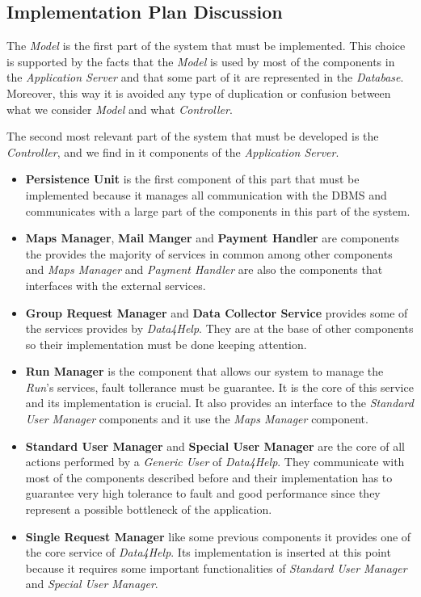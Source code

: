 \subsection{Implementation Plan Discussion}
\myparagraph{}
The \textit{Model} is the first part of the system that must be implemented. This choice is supported by the facts that the \textit{Model} is used by most of the components in the \textit{Application Server} and that some part of it are represented in the \textit{Database}. Moreover, this way it is avoided any type of duplication or confusion between what we consider \textit{Model} and what \textit{Controller}.

\myparagraph{}
The second most relevant part of the system that must be developed is the \textit{Controller}, and we find in it components of the \textit{Application Server}.
\begin{itemize}
  \item \textbf{Persistence Unit} is the first component of this part that must be implemented because it manages all communication with the DBMS and communicates with a large part of the components in this part of the system.
  \item \textbf{Maps Manager}, \textbf{Mail Manger} and \textbf{Payment Handler} are components the provides the majority of services in common among other components and \textit{Maps Manager} and \textit{Payment Handler} are also the components that interfaces with the external services.
  \item \textbf{Group Request Manager} and \textbf{Data Collector Service} provides some of the services provides by \textit{Data4Help}. They are at the base of other components so their implementation must be done keeping attention.
  \item \textbf{Run Manager} is the component that allows our system to manage the \textit{Run}'s services, fault tollerance must be guarantee. It is the core of this service and its implementation is crucial. It also provides an interface to the \textit{Standard User Manager} components and it use the \textit{Maps Manager} component.
  \item \textbf{Standard User Manager} and \textbf{Special User Manager} are the core of all actions performed by a \textit{Generic User} of \textit{Data4Help}. They communicate with most of the components described before and their implementation has to guarantee very high tolerance to fault and good performance since they represent a possible bottleneck of the application.
  \clearpage
  \item \textbf{Single Request Manager} like some previous components it provides one of the core service of \textit{Data4Help}. Its implementation is inserted at this point because it requires some important functionalities of \textit{Standard User Manager} and \textit{Special User Manager}.
\end{itemize}

